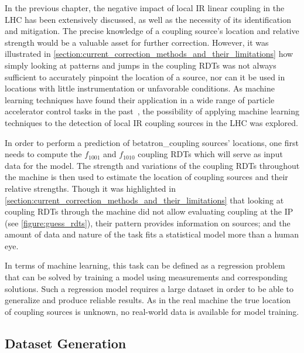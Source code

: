 In the previous chapter, the negative impact of local \gls{IR} linear coupling in the \gls{LHC} has been extensively discussed, as well as the necessity of its identification and mitigation.
The precise knowledge of a coupling source's location and relative strength would be a valuable asset for further correction.
However, it was illustrated in \cref{section:current_correction_methods_and_their_limitations} how simply looking at patterns and jumps in the coupling \glspl{RDT} was not always sufficient to accurately pinpoint the  location of a source, nor can it be used in locations with little instrumentation or unfavorable conditions.
As machine learning techniques have found their application in a wide range of particle accelerator control tasks in the past~\cite{IPAC:Fol:Machine_Learning_Methods_for_Optics_Measurements_and_Corrections_at_LHC, IEEE:Edelen:Neural_Networks_Modeling_Control_Particle_Accelerators, EPAC:Bozoki:Neural_Networks_Orbit_Control_Accelerators, IPAC:Meier:Orbit_Correction_Studies_using_Neural_Networks, EPAC:Kijima:Beam_Diagnostic_System_for_Accelerator_using_Neural_Networks, PRAB:Fol:Detection_Faulty_BPMs, EPJP:Fol:Supervised_Learning_Reconstruction_Magnet_Errors}, the possibility of applying machine learning techniques to the detection of local IR coupling sources in the LHC was explored.

In order to perform a prediction of \gls{betatron_coupling} sources' locations, one first needs to compute the \(f_{1001}\) and \(f_{1010}\) coupling \glspl{RDT} which will serve as input data for the model.
The strength and variations of the coupling RDTs throughout the machine is then used to estimate the location of coupling sources and their relative strengths.
Though it was highlighted in \cref{section:current_correction_methods_and_their_limitations} that looking at coupling RDTs through the machine did not allow evaluating coupling at the \gls{IP} (see \cref{figure:guess_rdts}), their pattern provides information on sources; and the amount of data and nature of the task fits a statistical model more than a human eye.

In terms of machine learning, this task can be defined as a regression problem that can be solved by training a model using measurements and corresponding solutions.
Such a regression model requires a large dataset in order to be able to generalize and produce reliable results.
As in the real machine the true location of coupling sources is unknown, no real-world data is available for model training.

\subsection{Dataset Generation}

